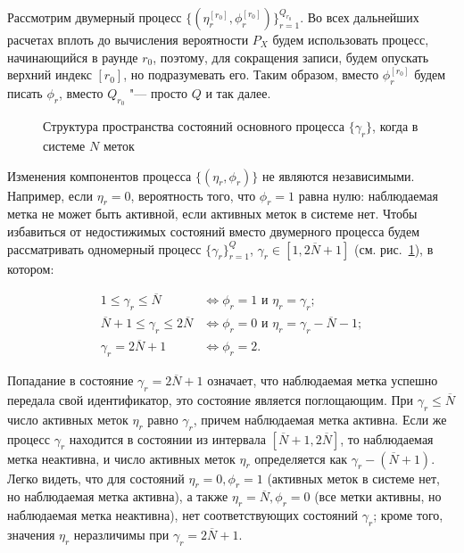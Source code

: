 Рассмотрим двумерный процесс $\{ (\eta_r^{[r_0]}, \phi_r^{[r_0]}) \}_{r=1}^{Q_{r_0}}$. Во всех дальнейших расчетах вплоть до вычисления вероятности $P_X$ будем использовать процесс, начинающийся в раунде $r_0$, поэтому, для сокращения записи, будем опускать верхний индекс $[r_0]$, но подразумевать его. Таким образом, вместо $\phi_r^{[r_0]}$ будем писать $\phi_r$, вместо $Q_{r_0}$ "--- просто $Q$ и так далее.

\begin{figure}[htb]
  \caption{Структура пространства состояний основного процесса $\{\gamma_r\}$, когда в системе $N$ меток}
  \label{fig:ch3_fg_structure}
\end{figure}

Изменения компонентов процесса $\{ (\eta_r, \phi_r) \}$ не являются независимыми. Например, если $\eta_r = 0$, вероятность того, что $\phi_r = 1$ равна нулю: наблюдаемая метка не может быть активной, если активных меток в системе нет. Чтобы избавиться от недостижимых состояний вместо двумерного процесса будем рассматривать одномерный процесс $\{ \gamma_r \}_{r=1}^Q$, $\gamma_r \in [1, 2\overline{N}+1]$ (см. рис.~\ref{fig:ch3_fg_structure}), в котором:

\begin{equation}\label{eq:ch3_gamma_process}
	\begin{aligned}
		1 \leqslant \gamma_r \leqslant \overline{N}                 &\Leftrightarrow \phi_r = 1 \text{ и } \eta_r = \gamma_r; \\
		\overline{N} + 1 \leqslant \gamma_r \leqslant 2\overline{N} &\Leftrightarrow \phi_r = 0 \text{ и } \eta_r = \gamma_r - \overline{N} - 1;\\
		\gamma_r = 2\overline{N}+1                                  &\Leftrightarrow \phi_r = 2.
	\end{aligned}
\end{equation}

Попадание в состояние $\gamma_r = 2\overline{N} + 1$ означает, что наблюдаемая метка успешно передала свой идентификатор, это состояние является поглощающим. При $\gamma_r \leqslant \overline{N}$ число активных меток $\eta_r$ равно $\gamma_r$, причем наблюдаемая метка активна. Если же процесс $\gamma_r$ находится в состоянии из интервала $[\overline{N}+1, 2\overline{N}]$, то наблюдаемая метка неактивна, и число активных меток $\eta_r$ определяется как $\gamma_r - (\overline{N}+1)$. Легко видеть, что для состояний $\eta_r = 0, \phi_r = 1$ (активных меток в системе нет, но наблюдаемая метка активна), а также $\eta_r = \overline{N}, \phi_r = 0$ (все метки активны, но наблюдаемая метка неактивна), нет соответствующих состояний $\gamma_r$; кроме того, значения $\eta_r$ неразличимы при $\gamma_r = 2\overline{N} + 1$.

